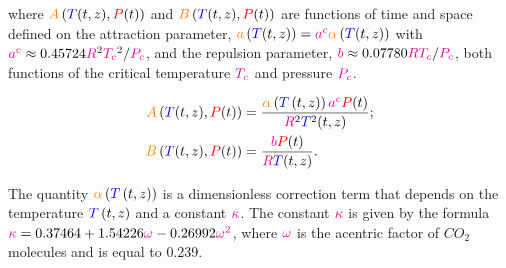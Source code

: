 \documentclass[../Article_Model_Parameters.tex]{subfiles}
\begin{document}
	where ${\color{orange}A}\left({\color{blue}T}(t,z), {\color{red}P}(t)\right)$ and ${\color{orange}B}\left({\color{blue}T}(t,z), {\color{red}P}(t)\right)$ are functions of time and space defined on the attraction parameter, ${\color{orange}a}\left({\color{blue}T}(t,z)\right) = {\color{magenta}a^c}{\color{orange}\alpha}\left({\color{blue}T}(t,z)\right)$ with ${\color{magenta}a^c} \approx 0.45724 {{\color{magenta}R}^2{\color{magenta}T_c}^2}/{{\color{magenta}P_c}}$, and the repulsion parameter, ${\color{magenta}b} \approx 0.07780 {{\color{magenta}R}{\color{magenta}T_c}}/{{\color{magenta}P_c}}$, both functions of the critical temperature ${\color{magenta}T_c}$ and pressure ${\color{magenta}P_c}$. 

	{\footnotesize
	\begin{subequations} \label{eq: PR_AB}
		\begin{align} 
			{\color{orange}A}\left({\color{blue}T}(t,z), {\color{red}P}(t)\right)	& = \dfrac{{\color{orange}\alpha}\left({\color{blue}T}\left(t,z\right)\right){\color{magenta}a^c}{\color{red}P}(t)}{{\color{magenta}R}^2{\color{blue}T}^2(t,z)};													\label{eq: PR_A}\\
			{\color{orange}B}\left({\color{blue}T}(t,z), {\color{red}P}(t)\right)	& = \dfrac{{\color{magenta}b}{\color{red}P}(t)}{{\color{magenta}R}{\color{blue}T}(t,z)}	\label{eq: PR_B}.
		\end{align}
	\end{subequations}}

	The quantity ${\color{orange}\alpha}\left({\color{blue}T}\left(t,z\right)\right)$ is a dimensionless correction term that depends on the temperature ${\color{blue}T}\left(t,z\right)$ and a constant ${\color{magenta}\kappa}$. The constant ${\color{magenta}\kappa}$ is given by the formula ${\color{magenta}\kappa} = 0.37464 + 1.54226 {\color{magenta}\omega} - 0.26992 {\color{magenta}\omega^2}$, where ${\color{magenta}\omega}$ is the acentric factor of $CO_2$ molecules and is equal to 0.239.
	

	
\end{document}
